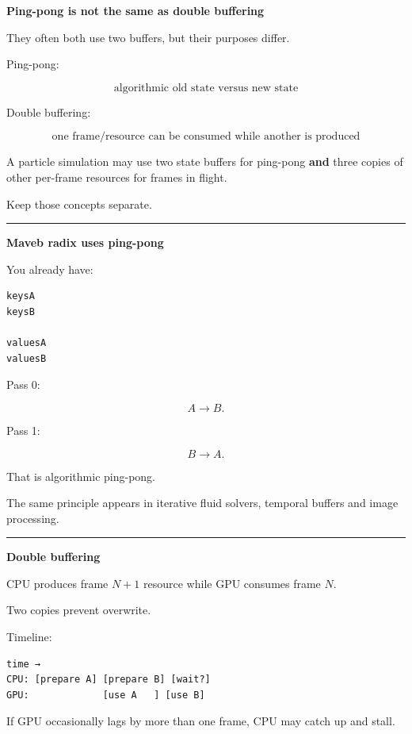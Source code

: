 \textbf{Ping-pong is not the same as double buffering}

They often both use two buffers, but their purposes differ.

Ping-pong:

\[
\boxed{
\text{algorithmic old state versus new state}
}
\]

Double buffering:

\[
\boxed{
\text{one frame/resource can be consumed while another is produced}
}
\]

A particle simulation may use two state buffers for ping-pong \textbf{and} three copies of other per-frame resources for frames in flight.

Keep those concepts separate.

\begin{center}\rule{0.5\linewidth}{0.5pt}\end{center}

\textbf{Maveb radix uses ping-pong}

You already have:

\protect{}\label{p10-radix-ping}%
\begin{verbatim}
keysA
keysB

valuesA
valuesB
\end{verbatim}

Pass 0:

\[
A\rightarrow B.
\]

Pass 1:

\[
B\rightarrow A.
\]

That is algorithmic ping-pong.

The same principle appears in iterative fluid solvers, temporal buffers and image processing.

\begin{center}\rule{0.5\linewidth}{0.5pt}\end{center}

\textbf{Double buffering}

CPU produces frame \(N+1\) resource while GPU consumes frame \(N\).

Two copies prevent overwrite.

Timeline:

\protect{}\label{p10-double}%
\begin{verbatim}
time →
CPU: [prepare A] [prepare B] [wait?]
GPU:             [use A   ] [use B]
\end{verbatim}

If GPU occasionally lags by more than one frame, CPU may catch up and stall.

